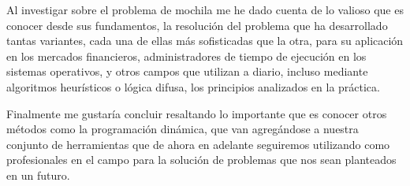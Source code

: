     Al investigar sobre el problema de mochila me he dado cuenta de lo valioso que es conocer desde sus fundamentos, la resolución del problema que ha desarrollado tantas variantes, cada una de ellas más sofisticadas que la otra, para su aplicación en los mercados financieros, administradores de tiempo de ejecución en los sistemas operativos, y otros campos que utilizan a diario, incluso mediante algoritmos heurísticos o lógica difusa, los principios analizados en la práctica.
    
    Finalmente me gustaría concluir resaltando lo importante que es conocer otros métodos como la programación dinámica, que van agregándose a nuestra conjunto de herramientas que de ahora en adelante seguiremos utilizando como profesionales en el campo para la solución de problemas que nos sean planteados en un futuro.